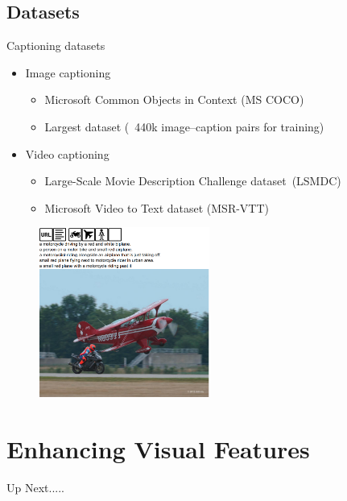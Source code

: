\documentclass{beamer}
\begin{document}
\subsection{Datasets}
\begin{frame}{Captioning datasets}
\begin{itemize}
    \item Image captioning
       \begin{itemize}
            \item Microsoft Common Objects in Context (MS COCO)
            \item Largest dataset (~440k image--caption pairs for training)
       \end{itemize}
       \item Video captioning
       \begin{itemize}
            \item Large-Scale Movie Description Challenge dataset~(LSMDC)
            \item Microsoft Video to Text dataset (MSR-VTT) 
       \end{itemize}
\end{itemize}\vspace{-3mm}
    \begin{figure}[h]
        \centering
        \includegraphics[width=0.5\textwidth]{images/Coco_sample.png}
        \vfill
    \end{figure}
\end{frame}
\section{Enhancing Visual Features}
\begin{frame}{Up Next.....}
\tableofcontents[currentsection] 
\end{frame}
\end{document}
